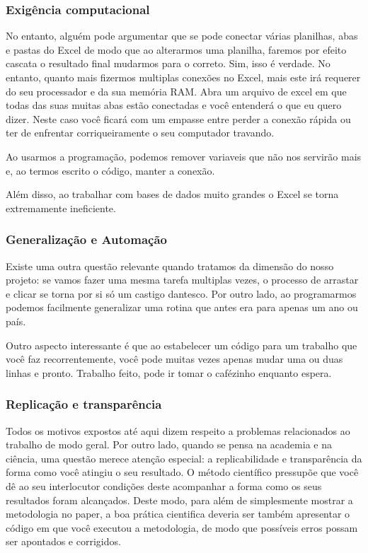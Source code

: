 \documentclass[
]{article}
\begin{document}
\hypertarget{exiguxeancia-computacional}{%
\subsubsection{Exigência
computacional}\label{exiguxeancia-computacional}}

No entanto, alguém pode argumentar que se pode conectar várias
planilhas, abas e pastas do Excel de modo que ao alterarmos uma
planilha, faremos por efeito cascata o resultado final mudarmos para o
correto. Sim, isso é verdade. No entanto, quanto mais fizermos multiplas
conexões no Excel, mais este irá requerer do seu processador e da sua
memória RAM. Abra um arquivo de excel em que todas das suas muitas abas
estão conectadas e você entenderá o que eu quero dizer. Neste caso você
ficará com um empasse entre perder a conexão rápida ou ter de enfrentar
corriqueiramente o seu computador travando.

Ao usarmos a programação, podemos remover variaveis que não nos servirão
mais e, ao termos escrito o código, manter a conexão.

Além disso, ao trabalhar com bases de dados muito grandes o Excel se
torna extremamente ineficiente.

\hypertarget{generalizauxe7uxe3o-e-automauxe7uxe3o}{%
\subsubsection{Generalização e
Automação}\label{generalizauxe7uxe3o-e-automauxe7uxe3o}}

Existe uma outra questão relevante quando tratamos da dimensão do nosso
projeto: se vamos fazer uma mesma tarefa multiplas vezes, o processo de
arrastar e clicar se torna por si só um castigo dantesco. Por outro
lado, ao programarmos podemos facilmente generalizar uma rotina que
antes era para apenas um ano ou país.

Outro aspecto interessante é que ao estabelecer um código para um
trabalho que você faz recorrentemente, você pode muitas vezes apenas
mudar uma ou duas linhas e pronto. Trabalho feito, pode ir tomar o
cafézinho enquanto espera.

\hypertarget{replicauxe7uxe3o-e-transparuxeancia}{%
\subsubsection{Replicação e
transparência}\label{replicauxe7uxe3o-e-transparuxeancia}}

Todos os motivos expostos até aqui dizem respeito a problemas
relacionados ao trabalho de modo geral. Por outro lado, quando se pensa
na academia e na ciência, uma questão merece atenção especial: a
replicabilidade e transparência da forma como você atingiu o seu
resultado. O método científico pressupõe que você dê ao seu interlocutor
condições deste acompanhar a forma como os seus resultados foram
alcançados. Deste modo, para além de simplesmente mostrar a metodologia
no paper, a boa prática cientifica deveria ser também apresentar o
código em que você executou a metodologia, de modo que possíveis erros
possam ser apontados e corrigidos.
\end{document}
